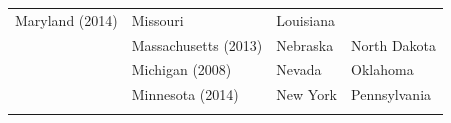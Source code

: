 \documentclass[11pt,]{article}
\begin{document}
\begin{longtable}[]{@{}llll@{}}
\begin{minipage}[t]{0.26\columnwidth}
Maryland (2014)\strut
\end{minipage} & \begin{minipage}[t]{0.24\columnwidth}\raggedright
Missouri\strut
\end{minipage} & \begin{minipage}[t]{0.19\columnwidth}\raggedright
Louisiana\strut
\end{minipage}\tabularnewline
\begin{minipage}[t]{0.20\columnwidth}\raggedright
\strut
\end{minipage} & \begin{minipage}[t]{0.26\columnwidth}\raggedright
Massachusetts (2013)\strut
\end{minipage} & \begin{minipage}[t]{0.24\columnwidth}\raggedright
Nebraska\strut
\end{minipage} & \begin{minipage}[t]{0.19\columnwidth}\raggedright
North Dakota\strut
\end{minipage}\tabularnewline
\begin{minipage}[t]{0.20\columnwidth}\raggedright
\strut
\end{minipage} & \begin{minipage}[t]{0.26\columnwidth}\raggedright
Michigan (2008)\strut
\end{minipage} & \begin{minipage}[t]{0.24\columnwidth}\raggedright
Nevada\strut
\end{minipage} & \begin{minipage}[t]{0.19\columnwidth}\raggedright
Oklahoma\strut
\end{minipage}\tabularnewline
\begin{minipage}[t]{0.20\columnwidth}\raggedright
\strut
\end{minipage} & \begin{minipage}[t]{0.26\columnwidth}\raggedright
Minnesota (2014)\strut
\end{minipage} & \begin{minipage}[t]{0.24\columnwidth}\raggedright
New York\strut
\end{minipage} & \begin{minipage}[t]{0.19\columnwidth}\raggedright
Pennsylvania\strut
\end{minipage}\tabularnewline
\begin{minipage}[t]{0.20\columnwidth}\raggedright
\strut
\end{minipage} & \begin{minipage}[t]{0.26\columnwidth}\raggedright

\end{minipage}
\end{longtable}
\end{document}
